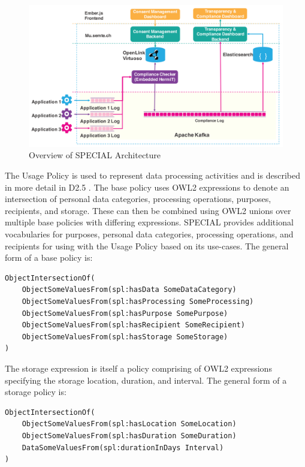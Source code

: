 \begin{figure}[htbp]
    \centering
    \includegraphics[width=\linewidth]{img/SPECIAL_architecture1.png}
    \caption{Overview of SPECIAL Architecture \cite{kirrane_scalable_2018}}
    \label{fig:SPECIAL-architecture1}
\end{figure}

The Usage Policy \cite{bonatti_special_2018-2} is used to represent data processing activities and is described in more detail in D2.5 \cite{bonatti_d2.5_2018}. The base policy uses OWL2 expressions to denote an intersection of personal data categories, processing operations, purposes, recipients, and storage. These can then be combined using OWL2 unions over multiple base policies with differing expressions. SPECIAL provides additional vocabularies for purposes, personal data categories, processing operations, and recipients for using with the Usage Policy based on its use-cases. The general form of a base policy is:
\begin{lstlisting}
ObjectIntersectionOf(
    ObjectSomeValuesFrom(spl:hasData SomeDataCategory)
    ObjectSomeValuesFrom(spl:hasProcessing SomeProcessing)
    ObjectSomeValuesFrom(spl:hasPurpose SomePurpose)
    ObjectSomeValuesFrom(spl:hasRecipient SomeRecipient)
    ObjectSomeValuesFrom(spl:hasStorage SomeStorage)
)
\end{lstlisting}
The storage expression is itself a policy comprising of OWL2 expressions specifying the storage location, duration, and interval. The general form of a storage policy is:
\begin{lstlisting}
ObjectIntersectionOf(
    ObjectSomeValuesFrom(spl:hasLocation SomeLocation)
    ObjectSomeValuesFrom(spl:hasDuration SomeDuration)
    DataSomeValuesFrom(spl:durationInDays Interval)
)
\end{lstlisting}

